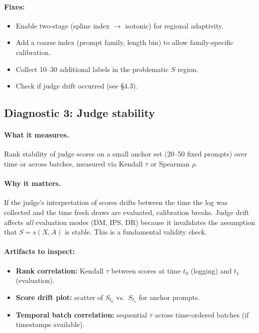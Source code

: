 \paragraph{Fixes:}
\begin{itemize}
\item Enable two-stage \autocal{} (spline index $\to$ isotonic) for regional adaptivity.
\item Add a coarse index (prompt family, length bin) to allow family-specific calibration.
\item Collect 10--30 additional labels in the problematic $S$ region.
\item Check if judge drift occurred (see §4.3).
\end{itemize}

\subsection{Diagnostic 3: Judge stability}

\paragraph{What it measures.} Rank stability of judge scores on a small anchor set (20--50 fixed prompts) over time or across batches, measured via Kendall $\tau$ or Spearman $\rho$.

\paragraph{Why it matters.} If the judge's interpretation of scores drifts between the time the log was collected and the time fresh draws are evaluated, calibration breaks. Judge drift affects \emph{all} evaluation modes (DM, IPS, DR) because it invalidates the assumption that $S = s(X, A)$ is stable. This is a fundamental validity check.

\paragraph{Artifacts to inspect:}
\begin{itemize}
\item \textbf{Rank correlation:} Kendall $\tau$ between scores at time $t_0$ (logging) and $t_1$ (evaluation).
\item \textbf{Score drift plot:} scatter of $S_{t_0}$ vs.\ $S_{t_1}$ for anchor prompts.
\item \textbf{Temporal batch correlation:} sequential $\tau$ across time-ordered batches (if timestamps available).
\end{itemize}

